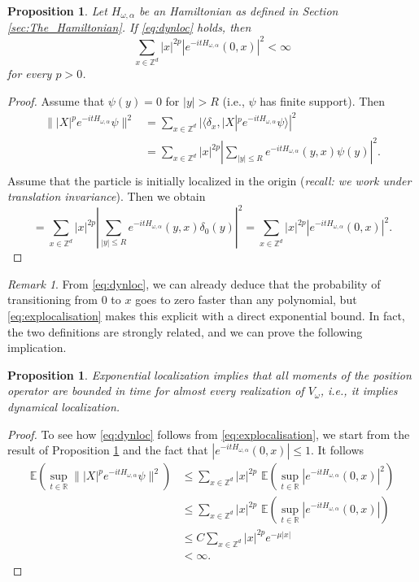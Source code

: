 \documentclass[11pt, a4paper, UKenglish, oneside]{book}
\theoremstyle{plain}
\newtheorem{proposition}[theorem]{Proposition}
\theoremstyle{remark}
\newtheorem{remark}[theorem]{Remark}
\theoremstyle{definition}
\numberwithin{equation}{section}
\numberwithin{theorem}{section}
\begin{document}
\begin{proposition}\label{prop:dynloccute}
    Let $H_{\omega, \alpha}$ be an Hamiltonian as defined in Section \ref{sec:The_Hamiltonian}. If \eqref{eq:dynloc} holds, then $$\sum_{x \in \mathbb{Z}^d} |x|^{2p} | e^{-itH_{\omega,\alpha}}(0,x)|^2 < \infty$$ for every $p > 0$.
\end{proposition}
\begin{proof}
    Assume that $\psi(y) = 0$ for $|y| > R$ (i.e., $\psi$ has finite support). Then
\begin{align*}
    \||X|^p e^{-itH_{\omega,\alpha}} \psi\|^2 &= \sum_{x \in \mathbb{Z}^d} |\langle \delta_x, |X|^p e^{-itH_{\omega,\alpha}} \psi \rangle|^2\\
    &= \sum_{x \in \mathbb{Z}^d} |x|^{2p} \left|\sum_{|y|\le R}  e^{-itH_{\omega,\alpha}}(y,x) \psi(y)\right|^2.\\
\end{align*}
Assume that the particle is initially localized in the origin (\textit{recall: we work under translation invariance}). Then we obtain $$ = \sum_{x \in \mathbb{Z}^d} |x|^{2p} \left|\sum_{|y|\le R}  e^{-itH_{\omega,\alpha}}(y,x) \delta_0(y) \right|^2 =\sum_{x \in \mathbb{Z}^d} |x|^{2p} | e^{-itH_{\omega,\alpha}}(0,x)|^2.$$
\end{proof}

\begin{remark}
From \eqref{eq:dynloc}, we can already deduce that the probability of transitioning from $0$ to $x$ goes to zero faster than any polynomial, but \eqref{eq:explocalisation} makes this explicit with a direct exponential bound. In fact, the two definitions are strongly related, and we can prove the following implication.
\end{remark}

\begin{proposition}\label{prop:exptodyn}
Exponential localization implies that all moments of the position operator are bounded in time for almost every realization of $V_\omega$, i.e., it implies dynamical localization. 
\end{proposition}

\begin{proof}
To see how \eqref{eq:dynloc} follows from \eqref{eq:explocalisation}, we start from the result of Proposition \ref{prop:dynloccute} and the fact that $|e^{-itH_{\omega,\alpha}}(0,x)| \le 1$. It follows
\begin{align}
    \mathbb{E}\left(\sup_{t \in \mathbb{R}} \||X|^p e^{-itH_{\omega,\alpha}} \psi\|^2\right) &\le \sum_{x \in \mathbb{Z}^d} |x|^{2p}\,\, \mathbb{E}\left(\sup_{t \in \mathbb{R}} |e^{-itH_{\omega,\alpha}}(0,x)|^2\right)\\ \nonumber
    &\le \sum_{x \in \mathbb{Z}^d} |x|^{2p}\,\, \mathbb{E}\left(\sup_{t \in \mathbb{R}} |e^{-itH_{\omega,\alpha}}(0,x)|\right)\\ \nonumber
    &\le C \sum_{x \in \mathbb{Z}^d} |x|^{2p} e^{-\mu|x|} \\
    &< \infty.\nonumber
\end{align}
\end{proof}
\end{document}
